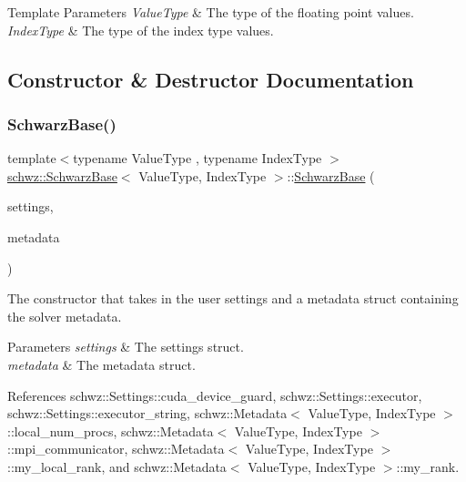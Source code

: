 \begin{DoxyTemplParams}{Template Parameters}
{\em Value\+Type} & The type of the floating point values. \\
\hline
{\em Index\+Type} & The type of the index type values. \\
\hline
\end{DoxyTemplParams}


\subsection{Constructor \& Destructor Documentation}
\mbox{\label{classschwz_1_1SchwarzBase_ab746eb6bb1c40d110ebd03cef0ddb415}} 
\subsubsection{\texorpdfstring{Schwarz\+Base()}{SchwarzBase()}}
{\footnotesize\ttfamily template$<$typename Value\+Type , typename Index\+Type $>$ \\
\hyperlink{classschwz_1_1SchwarzBase}{schwz\+::\+Schwarz\+Base}$<$ Value\+Type, Index\+Type $>$\+::\hyperlink{classschwz_1_1SchwarzBase}{Schwarz\+Base} (\begin{DoxyParamCaption}\item[{\hyperlink{structschwz_1_1Settings}{Settings} \&}]{settings,  }\item[{\hyperlink{structschwz_1_1Metadata}{Metadata}$<$ Value\+Type, Index\+Type $>$ \&}]{metadata }\end{DoxyParamCaption})}



The constructor that takes in the user settings and a metadata struct containing the solver metadata. 


\begin{DoxyParams}{Parameters}
{\em settings} & The settings struct. \\
\hline
{\em metadata} & The metadata struct. \\
\hline
\end{DoxyParams}


References schwz\+::\+Settings\+::cuda\+\_\+device\+\_\+guard, schwz\+::\+Settings\+::executor, schwz\+::\+Settings\+::executor\+\_\+string, schwz\+::\+Metadata$<$ Value\+Type, Index\+Type $>$\+::local\+\_\+num\+\_\+procs, schwz\+::\+Metadata$<$ Value\+Type, Index\+Type $>$\+::mpi\+\_\+communicator, schwz\+::\+Metadata$<$ Value\+Type, Index\+Type $>$\+::my\+\_\+local\+\_\+rank, and schwz\+::\+Metadata$<$ Value\+Type, Index\+Type $>$\+::my\+\_\+rank.



